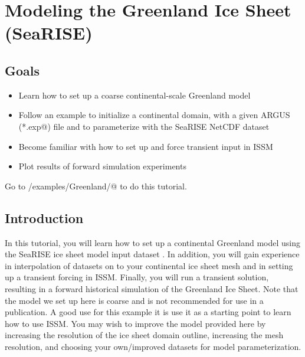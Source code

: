 \section{Modeling the Greenland Ice Sheet (SeaRISE)}
\subsection{Goals} %
\begin{itemize}
	\item Learn how to set up a coarse continental-scale Greenland model
	\item Follow an example to initialize a continental domain, with a given ARGUS (\verb@*.exp@) file and to parameterize with the SeaRISE NetCDF dataset
	\item Become familiar with how to set up and force transient input in ISSM
	\item Plot results of forward simulation experiments
\end{itemize}
Go to \verb@trunk/examples/Greenland/@ to do this tutorial.
\subsection{Introduction}%
In this tutorial, you will learn how to set up a continental Greenland model using the SeaRISE ice sheet model input dataset \citep{Nowicki2013a}. In addition, you will gain experience in interpolation of datasets on to your continental ice sheet mesh and in setting up a transient forcing in ISSM. Finally, you will run a transient solution, resulting in a forward historical simulation of the Greenland Ice Sheet. Note that the model we set up here is coarse and is not recommended for use in a publication. A good use for this example it is use it as a starting point to learn how to use ISSM. You may wish to improve the model provided here by increasing the resolution of the ice sheet domain outline, increasing the mesh resolution, and choosing your own/improved datasets for model parameterization.

